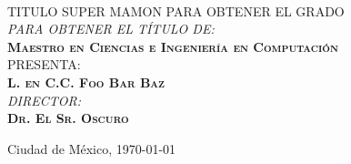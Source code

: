 \begin{changemargin}{-1cm}{-1.5cm}
{\begin{minipage}[c][0.75\textheight][t]{0.82\textwidth}
\begin{center}
          \\\vspace{5mm}
        {TITULO SUPER MAMON PARA OBTENER EL GRADO}\\
        \vspace{5mm}
        \textit{PARA OBTENER EL T\'ITULO DE:}\\\vspace{5mm}
        {{\scshape{\textbf{\Large{Maestro en Ciencias e Ingeniería
                  en Computación}}}}}\\[30pt]
        PRESENTA:\\[5pt]
        \Large{\textbf{\scshape{L. en C.C. Foo Bar Baz}}}\\
        \vspace{1cm}
        {{\textit{\normalsize{DIRECTOR:}}}\\[5pt]
          \textbf{\scshape{Dr. El Sr. Oscuro}}}
        \vspace{2cm}
        \begin{flushright}
          \small{{Ciudad de México,}{ }{\today}}
        \end{flushright}
      \end{center}
    \end{minipage}
  }
\end{changemargin}
\restoregeometry{}
\clearpage
